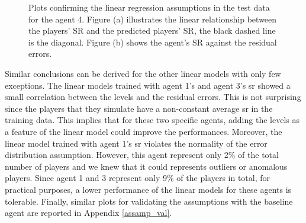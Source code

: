 \begin{figure}[h!]
  \centering
    
    \caption{Plots confirming the linear regression assumptions in the test data for the agent 4. Figure (a) illustrates the linear relationship between the players' SR and the predicted players' SR, the black dashed line is the diagonal. Figure (b) shows the agent's SR against the residual errors.}
    \label{fig:test_example_residuals}
\end{figure}
Similar conclusions can be derived for the other linear models with only few exceptions. The linear models trained with agent 1's and agent 3's \acs{sr} showed a small correlation between the levels and the residual errors. This is not surprising since the players that they simulate have a non-constant average \acs{sr} in the training data. This implies that for these two specific agents, adding the levels as a feature of the linear model could improve the performances. Moreover, the linear model trained with agent 1's \acs{sr} violates the normality of the error distribution assumption. However, this agent represent only 2\% of the total number of players and we knew that it could represents outliers or anomalous players. Since agent 1 and 3 represent only 9\% of the players in total, for practical purposes, a lower performance of the linear models for these agents is tolerable. Finally, similar plots for validating the assumptions with the baseline agent are reported in Appendix \ref{assamp_val}.
